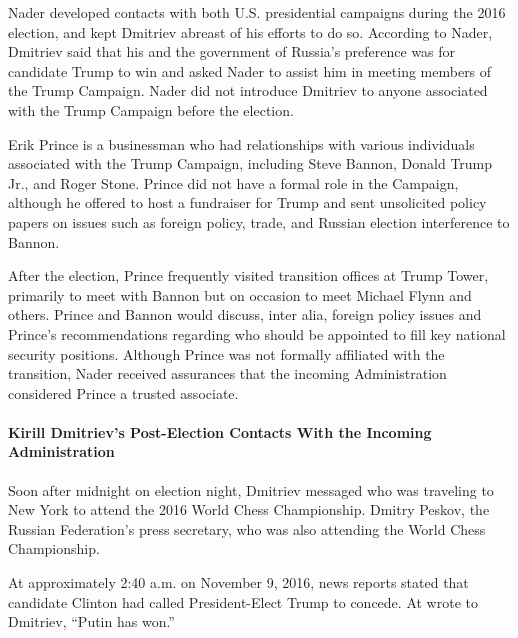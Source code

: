 Nader developed contacts with both U.S. presidential campaigns during the 2016 election, and kept Dmitriev abreast of his efforts to do so.%
According to Nader, Dmitriev said that his and the government of Russia's preference was for candidate Trump to win and asked Nader to assist him in meeting members of the Trump Campaign.%
Nader did not introduce Dmitriev to anyone associated with the Trump Campaign before the election.%


Erik Prince is a businessman who had relationships with various individuals associated with the Trump Campaign, including Steve Bannon, Donald Trump Jr., and Roger Stone.%
Prince did not have a formal role in the Campaign, although he offered to host a fundraiser for Trump and sent unsolicited policy papers on issues such as foreign policy, trade, and Russian election interference to Bannon.%

After the election, Prince frequently visited transition offices at Trump Tower, primarily to meet with Bannon but on occasion to meet Michael Flynn and others.%
Prince and Bannon would discuss, inter alia, foreign policy issues and Prince's recommendations regarding who should be appointed to fill key national security positions.%
Although Prince was not formally affiliated with the transition, Nader
received assurances
that the incoming Administration considered Prince a trusted associate.%

\paragraph{Kirill Dmitriev's Post-Election Contacts With the Incoming Administration}

Soon after midnight on election night, Dmitriev messaged
who was traveling to New York to attend the 2016 World Chess Championship.
Dmitry Peskov, the Russian Federation's press secretary, who was also attending the World Chess Championship.%

At approximately 2:40 a.m. on November 9, 2016, news reports stated that candidate Clinton had called President-Elect Trump to concede.
At
wrote to Dmitriev, ``Putin has won.''%

